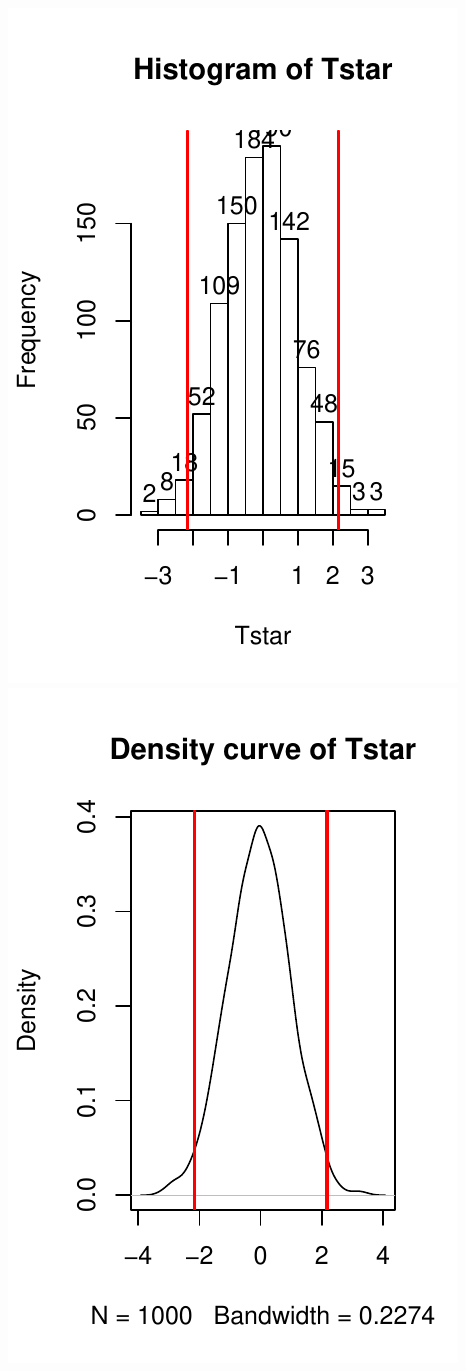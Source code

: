 \documentclass[]{book}
\begin{document}
\includegraphics{GreenwoodBanner_files/figure-latex/Figure2-12-1.pdf}
\includegraphics{GreenwoodBanner_files/figure-latex/Figure2-12-2.pdf}
\end{document}
